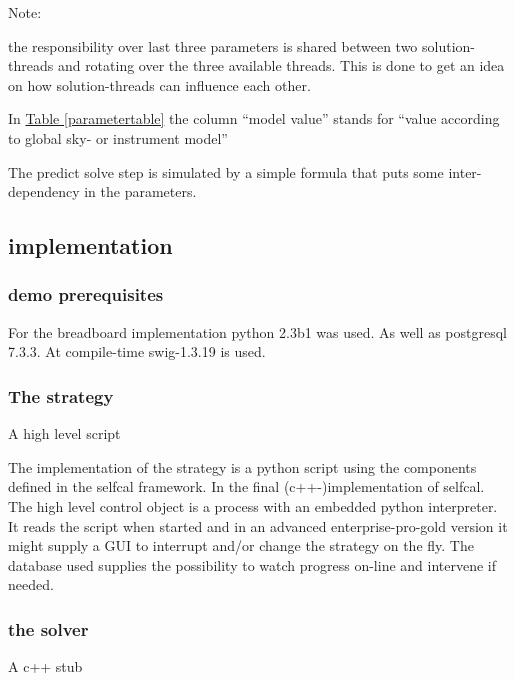 \documentclass[]{lofar}
\begin{document}
      \begin{em}\large{Note: }

        the responsibility over last three parameters is shared
        between two solution-threads and rotating over the three
        available threads. This is done to get an idea on how
        solution-threads can influence each other.
     
      \end{em}

      In \hyperlink{parametertable}{Table \ref{parametertable}} the
      column ``model value'' stands for ``value according to global
      sky- or instrument model''

      The predict solve step is simulated by a simple formula that
      puts some inter-dependency in the parameters.

    \subsection{implementation}
    \label{id2721359}\hypertarget{id2721359}{}%

      \subsubsection{demo prerequisites}
      \label{id2721362}\hypertarget{id2721362}{}%

        For the breadboard implementation python 2.3b1 was used.  As
        well as postgresql 7.3.3.  At compile-time swig-1.3.19 is used.

      \subsubsection{The strategy}
      \label{id2721371}\hypertarget{id2721371}{}%
        A high level script

        The implementation of the strategy is a python script using
        the components defined in the selfcal framework. In the final
        (c++-)implementation of selfcal. The high level control object
        is a process with an embedded python interpreter. It reads the
        script when started and in an advanced enterprise-pro-gold
        version it might supply a GUI to interrupt and/or change the
        strategy on the fly. The database used supplies the
        possibility to watch progress on-line and intervene if needed.

      \subsubsection{the solver}
      \label{id2721390}\hypertarget{id2721390}{}%
        A c++ stub
\end{document}
